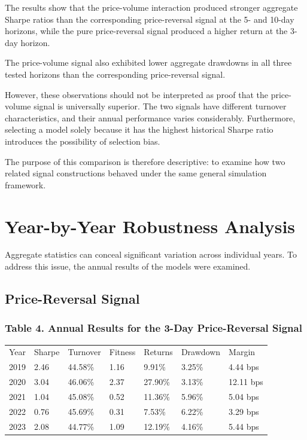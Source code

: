\documentclass{article}
\begin{document}
The results show that the price-volume interaction produced stronger aggregate Sharpe ratios than the corresponding price-reversal signal at the 5- and 10-day horizons, while the pure price-reversal signal produced a higher return at the 3-day horizon.

The price-volume signal also exhibited lower aggregate drawdowns in all three tested horizons than the corresponding price-reversal signal.

However, these observations should not be interpreted as proof that the price-volume signal is universally superior. The two signals have different turnover characteristics, and their annual performance varies considerably. Furthermore, selecting a model solely because it has the highest historical Sharpe ratio introduces the possibility of selection bias.

The purpose of this comparison is therefore descriptive: to examine how two related signal constructions behaved under the same general simulation framework.

\section{Year-by-Year Robustness Analysis}

Aggregate statistics can conceal significant variation across individual years. To address this issue, the annual results of the models were examined.

\subsection{ Price-Reversal Signal}

\subsubsection{Table 4. Annual Results for the 3-Day Price-Reversal Signal}

\begin{table}
\centering

\begin{tabular}{l l l l l l l}
Year & Sharpe & Turnover & Fitness & Returns & Drawdown & Margin \\

2019 & 2.46 & 44.58\% & 1.16 & 9.91\% & 3.25\% & 4.44 bps \\
2020 & 3.04 & 46.06\% & 2.37 & 27.90\% & 3.13\% & 12.11 bps \\
2021 & 1.04 & 45.08\% & 0.52 & 11.36\% & 5.96\% & 5.04 bps \\
2022 & 0.76 & 45.69\% & 0.31 & 7.53\% & 6.22\% & 3.29 bps \\
2023 & 2.08 & 44.77\% & 1.09 & 12.19\% & 4.16\% & 5.44 bps \\

\end{tabular}

\end{table}
\end{document}
